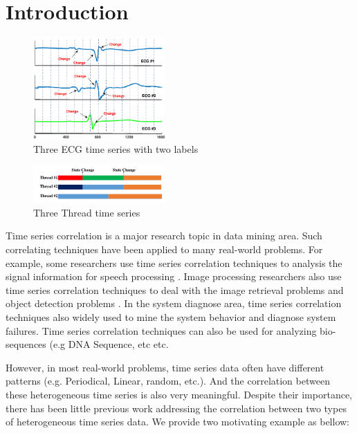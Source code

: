 \section{Introduction}
\label{sec:introduction}


\begin{figure}[t]
\centering
\includegraphics[width=0.45\textwidth]{ECGexp.eps}
\caption{ Three ECG time series with two labels }
\label{fig:ecgexample}
\end{figure}

\begin{figure}[t]
\centering
\includegraphics[width=0.45\textwidth]{HPCExample.pdf}
\caption{Three Thread time series}
\label{fig:hpcexample}
\end{figure}

Time series correlation is a major research topic in data mining area. 
Such correlating techniques have been applied to many real-world problems.
For example, some researchers use time series correlation techniques to analysis the signal information for speech processing \cite{rabiner1993fundamentals}.
Image processing researchers also use time series correlation techniques to deal with the image retrieval problems and object detection problems \cite{yang2002detecting, sonka2014image}.
In the system diagnose area\cite{luo2014correlating,sun2014querying}, time series correlation techniques also widely used to mine the system behavior and diagnose system failures. 
Time series correlation techniques can also be used for analyzing bio-sequences (e.g DNA Sequence, etc \cite{mount2001bioinformatics} etc. 

However, in most real-world problems, time series data often have different patterns (e.g. Periodical, Linear, random, etc.).  And the correlation between these heterogeneous time series is also very meaningful.
Despite their importance, there has been little previous work addressing the correlation between two types of heterogeneous time series data. We provide two motivating example as bellow:

